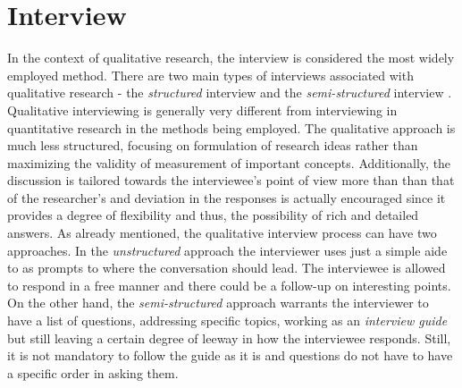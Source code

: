 \section{Interview}

In the context of qualitative research, the interview is considered the most widely employed method. There are two main types of interviews associated with qualitative research - the \textit{structured} interview and the \textit{semi-structured} interview . Qualitative interviewing is generally very different from  interviewing in quantitative research in the methods being employed. The qualitative approach is much less structured, focusing on formulation of research ideas rather than maximizing the validity of measurement of important concepts. Additionally, the discussion is tailored towards the interviewee's point of view more than than that of the researcher's and deviation in the responses is actually encouraged since it provides a degree of flexibility and thus, the possibility of rich and detailed answers. As already mentioned, the qualitative interview process can have two approaches. In the \textit{unstructured} approach the interviewer uses just a simple aide to as prompts to where the conversation should lead. The interviewee is allowed to respond in a free manner and there could be a follow-up on interesting points. On the other hand, the \textit{semi-structured} approach warrants the interviewer to have a list of questions, addressing specific topics, working as an \textit{interview guide} but still leaving a certain degree of leeway in how the interviewee responds. Still, it is not mandatory to follow the guide as it is and questions do not have to have a specific order in asking them. 

